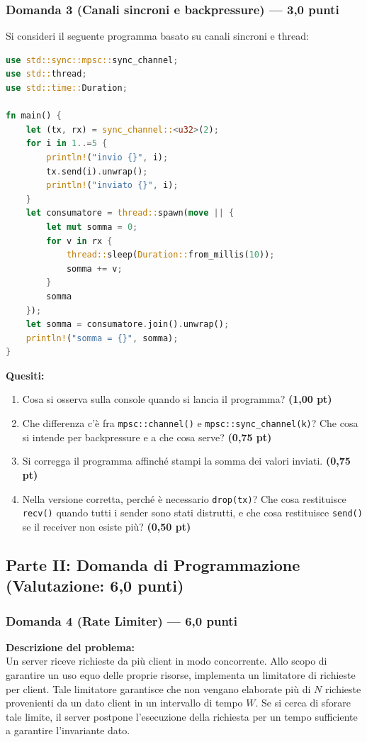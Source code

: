 \documentclass[11pt,a4paper]{article}
\begin{document}
\newpage
\subsubsection*{Domanda 3 (Canali sincroni e backpressure) --- 3,0 punti}
Si consideri il seguente programma basato su canali sincroni e thread:
\begin{lstlisting}[language=Rust]
use std::sync::mpsc::sync_channel;
use std::thread;
use std::time::Duration;

fn main() {
    let (tx, rx) = sync_channel::<u32>(2);
    for i in 1..=5 {
        println!("invio {}", i);
        tx.send(i).unwrap();
        println!("inviato {}", i);
    }
    let consumatore = thread::spawn(move || {
        let mut somma = 0;
        for v in rx {
            thread::sleep(Duration::from_millis(10));
            somma += v;
        }
        somma
    });
    let somma = consumatore.join().unwrap();
    println!("somma = {}", somma);
}
\end{lstlisting}
\textbf{Quesiti:}
\begin{enumerate}[label=\textbf{\Alph*.}]
    \item Cosa si osserva sulla console quando si lancia il programma? \hfill \textbf{(1,00 pt)}
    \item Che differenza c'è fra \texttt{mpsc::channel()} e \texttt{mpsc::sync\_channel(k)}? Che cosa si intende per backpressure e a che cosa serve? \hfill \textbf{(0,75 pt)}
    \item Si corregga il programma affinché stampi la somma dei valori inviati. \hfill \textbf{(0,75 pt)}
    \item Nella versione corretta, perché è necessario \texttt{drop(tx)}? Che cosa restituisce \texttt{recv()} quando tutti i sender sono stati distrutti, e che cosa restituisce \texttt{send()} se il receiver non esiste più? \hfill \textbf{(0,50 pt)}
\end{enumerate}

\vspace{1.5em}
\subsection*{Parte II: Domanda di Programmazione (Valutazione: 6,0 punti)}

\subsubsection*{Domanda 4 (Rate Limiter) --- 6,0 punti}
\textbf{Descrizione del problema:}\\
Un server riceve richieste da più client in modo concorrente. Allo scopo di garantire un uso equo delle proprie risorse, implementa un limitatore di richieste per client. Tale limitatore garantisce che non vengano elaborate più di $N$ richieste provenienti da un dato client in un intervallo di tempo $W$. Se si cerca di sforare tale limite, il server postpone l'esecuzione della richiesta per un tempo sufficiente a garantire l'invariante dato.
\end{document}
